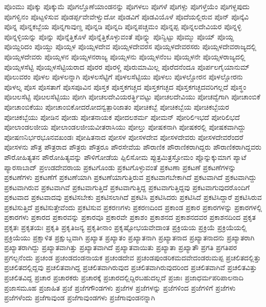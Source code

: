 {ಪೊಂಮು
ಪೊಕ್ಕು
ಪೊಕ್ಕುಮೆ
ಪೊಗಲ್ತೊಣೆಯಾಂಡನನ್ನು
ಪೊಗಳಲು
ಪೊಗಳೆ
ಪೊಗಳ್ಗು
ಪೊಗಳ್ತೆಯೆಂ
ಪೊಗಳ್ದಪುದು
ಪೊಗಳ್ವಿನಂ
ಪೊಟ್ಟಳಿಸುವ
ಪೊಡರ್ಪ್ಪವೇವೇಳ್ವುದೋ
ಪೊಡವಿಗೆ
ಪೊಡವಿಯೊಳೆ
ಪೊದೆಯಲ್ಲಿರುವ
ಪೊನ್
ಪೊನ್ಕೆವಿ
ಪೊನ್ನ
ಪೊನ್ನಕಬ್ಬೆಯ
ಪೊನ್ನಗಾವುಣ್ಡ
ಪೊನ್ನಡಿ
ಪೊನ್ನದಿ
ಪೊನ್ನಪಚ್ಚಮಂ
ಪೊನ್ನಪ್ಪ
ಪೊನ್ನಲದೇವಿಯರ
ಪೊನ್ನಳ್ಳಿ
ಪೊನ್ನಳ್ಳಿಯನ್ನು
ಪೊನ್ನು
ಪೊನ್ನೆತ್ತಿಕೊಳೆ
ಪೊನ್ನೆತ್ತಿಕೊಳ್ಳುವಂತೆ
ಪೊನ್ನ್ನು
ಪೊನ್ವಿಟ್ಟು
ಪೊಮ್ಮು
ಪೊಯ್
ಪೊಯ್ದ
ಪೊಯ್ದಿರಿದಂ
ಪೊಯ್ದು
ಪೊಯ್ಸಳ
ಪೊಯ್ಸಳದೇವ
ಪೊಯ್ಸಳದೇವರಸ
ಪೊಯ್ಸಳದೇವರಸರು
ಪೊಯ್ಸಳದೇವರಾಜ್ಯದಲ್ಲಿ
ಪೊಯ್ಸಳದೇವರು
ಪೊಯ್ಸಳನ
ಪೊಯ್ಸಳನರಾಜ್ಯ
ಪೊಯ್ಸಳನು
ಪೊಯ್ಸಳನೆಂಬ
ಪೊಯ್ಸಳನೇ
ಪೊಯ್ಸಳರಾಜ್ಯದಲ್ಲಿ
ಪೊಯ್ಸಳಸೆಟ್ಟಿ
ಪೊಯ್ಸಳಸೆಟ್ಟಿಯರಾದ
ಪೊರರ
ಪೊರಳ್ಚಿ
ಪೊರುಮಾಮಿಲ್ಲ
ಪೊರೆದನೆಂದೂ
ಪೊರ್ಪಲಗೈಯಾನುಮ್
ಪೊಲುವರಂ
ಪೊಳಲ
ಪೊಳಲನ್ನಾಗಿ
ಪೊಳಲಸೆಟ್ಟಿಗೆ
ಪೊಳಲಸೆಟ್ಟಿಯು
ಪೊಳಲು
ಪೊಳಲ್ಚೋರನ
ಪೊಳಲ್ಚೋರನು
ಪೊಳಲ್ನ
ಪೊಸ
ಪೊಸತಾಗೆ
ಪೊಸಪೂವಿನ
ಪೊಸ್ತಕ
ಪೊಸ್ತಕಗಚ್ಚದ
ಪೊಸ್ತಕಗಚ್ಛದ
ಪೊಸ್ತಕಗಚ್ಛದವರಿಗಲ್ಲದೆ
ಪೊಸ್ಥಂ
ಪೊೞಲಸೆಟ್ಟಿ
ಪೊೞಲಸೆಟ್ಟಿಯು
ಪೋಗಿ
ಪೋಚಲದೇವಿಯರರ್ತ್ಥಿವಟ್ಟು
ಪೋಚಲದೇವಿಯು
ಪೋಚವ್ವೆಗಾಗಿ
ಪೋಚಾಂಬಿಕೆ
ಪೋಚಾಂಬಿಕೆಯು
ಪೋಚಾಂಬಿಕೋದರೋದನ್ವತ್ಪಾರಿಜಾತಂ
ಪೋಚಿಕಬ್ಬೆ
ಪೋಚಿಕಬ್ಬೆಯ
ಪೋಚಿಕಬ್ಬೆಯರ
ಪೋಚಿಕಬ್ಬೆಯು
ಪೋಡಿನ
ಪೋಡು
ಪೋತನಾಯಕ
ಪೋದಲಶರ್ಮ
ಪೋಮನ್
ಪೋರಿಲಿಇಭದೆ
ಪೋರಿಲಿಭದೆ
ಪೋಲಾಂಡಲಜೀಯ
ಪೋಲಾಂಡಲಜೀಯವೀತರಾಸಿಯು
ಪೋಲ್ತು
ಪೋಷಕನಾಗಿ
ಪೋಷಕರಲ್ಲಿ
ಪೋಷಕವಾಗಿದ್ದು
ಪೋಷಣನಿರ್ಭರಭೂನವಖಂಡಃ
ಪೋಷಿತನಾದ
ಪೋಸಳ
ಪೋಸಳದೇವ
ಪೋಸಳದೇವರು
ಪೋಸಳದೇವರೆಂದರೆ
ಪೋಸಳನು
ಪೌತ್ರ
ಪೌತ್ರರಾದ
ಪೌತ್ರರು
ಪೌತ್ರರೂ
ಪೌರಸೇವೆಯ
ಪೌರಾಣಿಕ
ಪೌರಾಣಿಕರಾಗಿದ್ದರು
ಪೌರಾಣಿಕರಾಗಿದ್ದವರು
ಪೌರೋಹಿತ್ಯತನ
ಪೌರೋಹಿತ್ಯವನ್ನು
ಪೌಳಿಗೋಡೆಯ
ಪ್ಪಿಲಿಸೋಮ
ಪ್ಪುತ್ರಮಿತ್ರಸ್ತೋಮಂ
ಪ್ಪೊನ್ನುಕ್ಕುಮಾಗ
ಪ್ಯಾಟೆ
ಪ್ಯಾರಸಾಬಾದ್
ಪ್ರಉಡದೇವರಾಯ
ಪ್ರಕಟಗೊಂಡು
ಪ್ರಕಟಗೊಳ್ಳುವಂತೆ
ಪ್ರಕಟಣಾ
ಪ್ರಕಟಣೆ
ಪ್ರಕಟಣೆಗಳನ್ನು
ಪ್ರಕಟಣೆಗಳು
ಪ್ರಕಟಣೆಗೆ
ಪ್ರಕಟಣೆಯಾಗಿ
ಪ್ರಕಟಣೆಯಾಗುತ್ತಿರುವ
ಪ್ರಕಟವಾಗಬೇಕಾಗಿದೆ
ಪ್ರಕಟವಾಗಿದೆ
ಪ್ರಕಟವಾಗಿದ್ದು
ಪ್ರಕಟವಾಗಿರುವ
ಪ್ರಕಟವಾಗಿವೆ
ಪ್ರಕಟವಾಗುತ್ತಿದೆ
ಪ್ರಕಟವಾಗುತ್ತಿದ್ದ
ಪ್ರಕಟವಾಗುತ್ತಿದ್ದವು
ಪ್ರಕಟವಾಗುವುದರೊಂದಿಗೆ
ಪ್ರಕಟವಾದ
ಪ್ರಕಟವಾದವು
ಪ್ರಕಟಿಸಬೇಕು
ಪ್ರಕಟಿಸಲಾಗಿದೆ
ಪ್ರಕಟಿಸಿ
ಪ್ರಕಟಿಸಿದರು
ಪ್ರಕಟಿಸಿದೆ
ಪ್ರಕಟಿಸಿದ್ದಾರೆ
ಪ್ರಕಟಿಸಿರುವ
ಪ್ರಕಟಿಸುತ್ತಿದೆ
ಪ್ರಕಟಿಸುತ್ತೇವೆಂದು
ಪ್ರಕಟಿಸುವ
ಪ್ರಕರಣಗಳು
ಪ್ರಕರಣದಿಂದ
ಪ್ರಕಾಂಡ
ಪ್ರಕಾರ
ಪ್ರಕಾರಗಳನ್ನು
ಪ್ರಕಾರಗಳಲ್ಲಿ
ಪ್ರಕಾರಗಳು
ಪ್ರಕಾರದ
ಪ್ರಕಾರವನ್ನು
ಪ್ರಕಾರವೂ
ಪ್ರಕಾರವೇ
ಪ್ರಕಾಶಂ
ಪ್ರಕಾಶನದ
ಪ್ರಕಾಶನದವರ
ಪ್ರಕಾಶನದಿಂದ
ಪ್ರಕೃತ
ಪ್ರಕೃತಃ
ಪ್ರಕೃತಯಃ
ಪ್ರಕೃತಿ
ಪ್ರಕೃತಿಜನ್ಯ
ಪ್ರಕೃತೀನಾಂ
ಪ್ರಕೃಷ್ಟೋಭಯವೇದಾಂತ
ಪ್ರಕ್ರಿಯಯ
ಪ್ರಕ್ರಿಯೆ
ಪ್ರಕ್ರಿಯೆಯಲ್ಲಿ
ಪ್ರಕ್ರಿಯೆಯು
ಪ್ರಕ್ಷಾಳಿತ
ಪ್ರಕ್ಷುಬ್ದವಾಗಿ
ಪ್ರಖ್ಯಾತ
ಪ್ರಖ್ಯಾತಂ
ಪ್ರಖ್ಯಾತನಾಗಿ
ಪ್ರಖ್ಯಾತನಾದ
ಪ್ರಖ್ಯಾತನಾದನು
ಪ್ರಖ್ಯಾತರಾಗಿ
ಪ್ರಖ್ಯಾತರಾಗಿದ್ದು
ಪ್ರಖ್ಯಾತವಾಗಿತ್ತು
ಪ್ರಖ್ಯಾತವಾಗಿದೆ
ಪ್ರಖ್ಯಾತವಾಯಿತು
ಪ್ರಖ್ಯಾತಾ
ಪ್ರಖ್ಯಾತೌ
ಪ್ರಗತಿ
ಪ್ರಗತಿಪರ
ಪ್ರಗಲ್ಬನೆಂದು
ಪ್ರಚಂಡ
ಪ್ರಚಂಡದಂಡನಾಯಕ
ಪ್ರಚಂಡದೇವ
ಪ್ರಚಂಡಪುಂಡರಿಕಮದವೇದಂಡರುಮಪ್ಪ
ಪ್ರಚಲಿತದಲ್ಲಿತ್ತು
ಪ್ರಚಲಿತದಲ್ಲಿದ್ದವು
ಪ್ರಚಲಿತವಾಗಿದ್ದ
ಪ್ರಚಲಿತವಾಗಿರುವುದ
ಪ್ರಚಲಿತವಾಗಿರುವುದರಿಂದ
ಪ್ರಚಲಿತವಾಗಿವೆ
ಪ್ರಚಲಿತವಿತ್ತು
ಪ್ರಚಲಿತವಿದ್ದ
ಪ್ರಚಾರ
ಪ್ರಚಾರಕರು
ಪ್ರಚಾರಕ್ಕೆ
ಪ್ರಚಾರದಲ್ಲಿದ್ದಿರಬಹುದಲ್ಲದೆ
ಪ್ರಜಾಃ
ಪ್ರಜಾಧರ್ಮಪರಿಪಾಲನಾದಿ
ಪ್ರಜಾಸಮೂಹ
ಪ್ರಜಾಹಿತ
ಪ್ರಜೆ
ಪ್ರಜೆಗಗೌಂಡಗಳು
ಪ್ರಜೆಗಳ
ಪ್ರಜೆಗಳನ್ನು
ಪ್ರಜೆಗಳಿಂದ
ಪ್ರಜೆಗಳಿಗೆ
ಪ್ರಜೆಗಳು
ಪ್ರಜೆಗಳೆಂದು
ಪ್ರಜೆಗಾವುಂಡ
ಪ್ರಜೆಗಾವುಂಡಗಳು
ಪ್ರಜೆಗಾವುಂಡನನ್ನಾಗಿ
}
